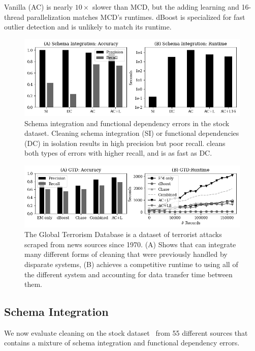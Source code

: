 Vanilla \sys (AC) is nearly $10\times$ slower than MCD, but the adding learning and 16-thread parallelization  matches MCD's runtimes.  dBoost is specialized for fast outlier detection and \sys is unlikely to match its runtime.  


\begin{figure}
    \centering
    \includegraphics[width=\columnwidth]{ac-experiments/exp3.png}
    \caption{\small Schema integration and functional dependency errors in the stock dataset.  Cleaning schema integration (SI) or functional dependencies (DC) in isolation results in high precision but poor recall.  \sys cleans both types of errors with higher recall, and is as fast as DC.  \label{exp3a}}
\end{figure}

\begin{figure}[ht]
    \centering
    \includegraphics[width=\columnwidth]{ac-experiments/exp7.png}
    \caption{The Global Terrorism Database is a dataset of terrorist attacks scraped from news sources since 1970. (A) Shows that \sys can integrate many different forms of cleaning that were previously handled by disparate systems, (B) \sys achieves a competitive runtime to using all of the different system and accounting for data transfer time between them. \label{exp7a}}
\end{figure}

\subsection*{Schema Integration}
We now evaluate cleaning on the stock dataset~\cite{data-flights} from 55 different sources that contains a mixture of schema integration and functional dependency errors.

